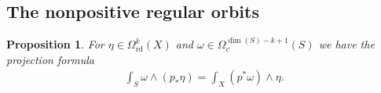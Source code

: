 \documentclass[a4paper,11pt]{amsart} %
\newcommand{\iotau}{\iota_{u\frac{\partial}{\partial u}}}
\newcommand{\8}{\infty}
\newcommand{\vbf}{\mathbf{v}}
\newcommand{\rd}{\textrm{rd}}
\theoremstyle{mytheoremstyle}
\newtheorem{prop}[thm]{Proposition}
\theoremstyle{remark}
\numberwithin{equation}{section}
\begin{document}
\subsection{The nonpositive regular orbits} \label{subsec:negative fourier}
\begin{prop}\cite[Proposition.~6.15]{botu} \label{projection}
    For $\eta \in \Omega^k_{\rd}(X)$ and $\omega \in \Omega_c^{\dim(S)-k+1}(S)$ we have the projection formula
    \begin{align}
      \int_S \omega \wedge \left   ( p_\ast \eta \right )= \int_X  ( p^\ast \omega) \wedge \eta.  
    \end{align}
\end{prop}
\end{document}
